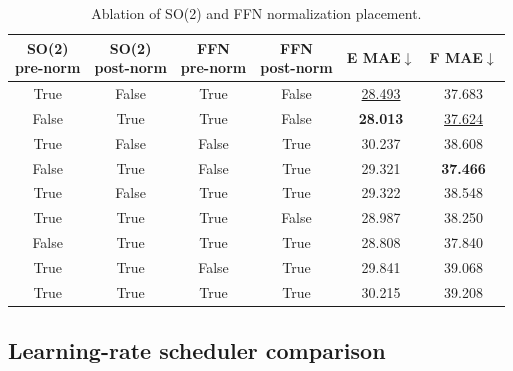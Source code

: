 \begin{table}[ht]
    \centering
    \scriptsize
    \caption{Ablation of SO(2) and FFN normalization placement.}
    \label{tab:sm_stability}
    \begin{tabular*}{\linewidth}{@{\extracolsep{\fill}}cccccc@{}}
        \toprule
        \makecell{\textbf{SO(2)}\\\textbf{pre-norm}}  &
        \makecell{\textbf{SO(2)}\\\textbf{post-norm}} &
        \makecell{\textbf{FFN}\\\textbf{pre-norm}}    &
        \makecell{\textbf{FFN}\\\textbf{post-norm}}   &
        \textbf{E MAE}$\downarrow$                    &
        \textbf{F MAE}$\downarrow$                                                                      \\
        \midrule
        True                                               & False & True  & False & \underline{28.493} & 37.683          \\
        False                                              & True  & True  & False & \textbf{28.013} & \underline{37.624} \\
        True                                               & False & False & True  & 30.237          & 38.608          \\
        False                                              & True  & False & True  & 29.321          & \textbf{37.466} \\
        True                                               & False & True  & True  & 29.322          & 38.548          \\
        True                                               & True  & True  & False & 28.987          & 38.250          \\
        False                                              & True  & True  & True  & 28.808          & 37.840          \\
        True                                               & True  & False & True  & 29.841          & 39.068          \\
        True                                               & True  & True  & True  & 30.215          & 39.208          \\
        \bottomrule
    \end{tabular*}
\end{table}

\FloatBarrier
\subsection{Learning-rate scheduler comparison}

